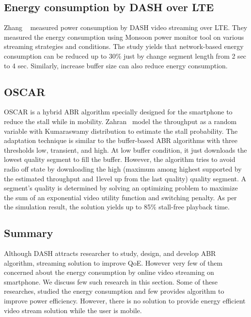 \subsection{Energy consumption by DASH over LTE}
Zhang \etal\ \cite{10.1145/2910018.2910656} measured power consumption by DASH video streaming over LTE. They measured the energy consumption using Monsoon power monitor \cite{monsoonmonitor} tool on various streaming strategies and conditions. The study yields that network-based energy consumption can be reduced up to 30\% just by change segment length from 2 sec to 4 sec. Similarly, increase buffer size can also reduce energy consumption.

\subsection{OSCAR}
OSCAR\cite{10.1145/2910018.2910655} is a hybrid ABR algorithm specially designed for the smartphone to reduce the stall while in mobility. Zahran \etal\ model the throughput as a random variable with Kumaraswamy distribution \cite{jones2009kumaraswamy} to estimate the stall probability. The adaptation technique is similar to the buffer-based ABR algorithms with three thresholds low, transient, and high. At low buffer condition, it just downloads the lowest quality segment to fill the buffer. However, the algorithm tries to avoid radio off state by downloading the high (maximum among highest supported by the estimated throughput and 1level up from the last quality) quality segment. A segment's quality is determined by solving an optimizing problem to maximize the sum of an exponential video utility function and switching penalty. As per the simulation result, the solution yields up to 85\% stall-free playback time.

\subsection{Summary}
Although DASH attracts researcher to study, design, and develop ABR algorithm, streaming solution to improve QoE. However very few of them concerned about the energy consumption by online video streaming on smartphone. We discuss few such research in this section. Some of these researches, studied the energy consumption\cite{10.1145/2910018.2910656} and few provides algorithm to improve power efficiency\cite{10.1145/2910018.2910655}. However, there is no solution to provide energy efficient video stream solution while the user is mobile.